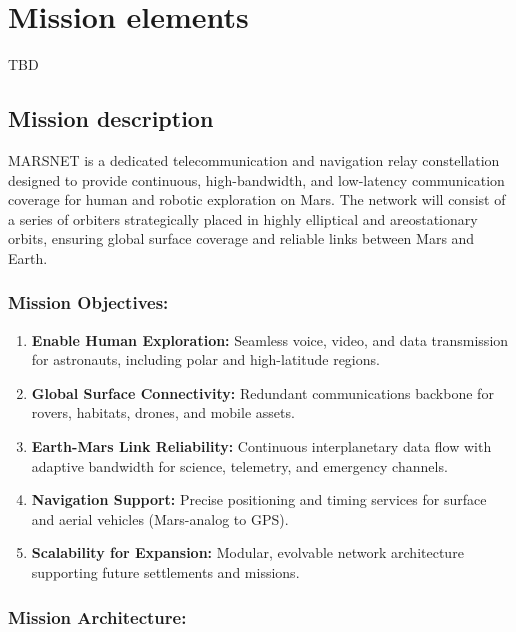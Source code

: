 \documentclass[../main.tex]{subfiles}
\begin{document}
\section{Mission elements}\label{mission-elements}
TBD

\subsection{Mission description}\label{mission-description}

MARSNET is a dedicated telecommunication and navigation relay
constellation designed to provide continuous, high-bandwidth, and low-latency
communication coverage for human and robotic exploration on Mars. The network
will consist of a series of orbiters strategically placed in highly elliptical
and areostationary orbits, ensuring global surface coverage and reliable links
between Mars and Earth.

\subsubsection*{Mission Objectives:}

\begin{enumerate}[left=0pt, label=\arabic*., itemsep=2pt, topsep=2pt]
    \item \textbf{Enable Human Exploration:} Seamless voice, video, and data transmission for astronauts, including polar and high-latitude regions.
    \item \textbf{Global Surface Connectivity:} Redundant communications backbone for rovers, habitats, drones, and mobile assets.
    \item \textbf{Earth-Mars Link Reliability:} Continuous interplanetary data flow with adaptive bandwidth for science, telemetry, and emergency channels.
    \item \textbf{Navigation Support:} Precise positioning and timing services for surface and aerial vehicles (Mars-analog to GPS).
    \item \textbf{Scalability for Expansion:} Modular, evolvable network architecture supporting future settlements and missions.
\end{enumerate}

\subsubsection*{Mission Architecture:}
\end{document}
